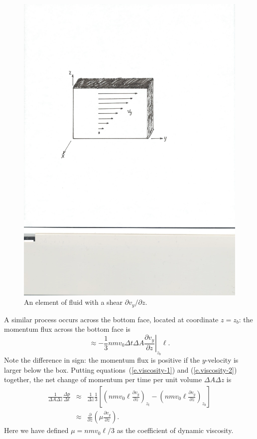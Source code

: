 \begin{figure}[htbp]
\includegraphics[width=\textwidth]{Figures/shear-diagram}
\caption{An element of fluid with a shear $\partial v_{y}/\partial z$.}\label{f.shear-diagram}
\end{figure}

A similar process occurs across the bottom face, located at coordinate $z=z_{b}$: the momentum flux across the bottom face is
\begin{equation}\label{e.viscosity-2} 
\approx -\frac{1}{3} n m v_{0} \Delta t\Delta A \left.\frac{\partial v_{y}}{\partial z}\right|_{z_{b}}\ell.
\end{equation}
Note the difference in sign: the momentum flux is positive if the $y$-velocity is larger below the box.  Putting equations~(\ref{e.viscosity-1}) and (\ref{e.viscosity-2}) together, the net change of momentum per time per unit volume $\Delta A\Delta z$ is
\begin{eqnarray}
\frac{1}{\Delta A\Delta z}\frac{\Delta p}{\Delta t} &\approx&  \frac{1}{\Delta z} \frac{1}{3} \left[\left(n m v_{0}\ell\frac{\partial v_{y}}{\partial z}\right)_{z_{t}} - \left(n m v_{0} \ell\frac{\partial v_{y}}{\partial z}\right)_{z_{b}}\right]\nonumber\\
 &\approx&   \frac{\partial}{\partial z}\left( \mu \frac{\partial v_{y}}{\partial z}\right).
\label{e.viscosity-3}
\end{eqnarray}
Here we have defined $\mu = nmv_{0}\ell/3 $ as the coefficient of dynamic viscosity. 

